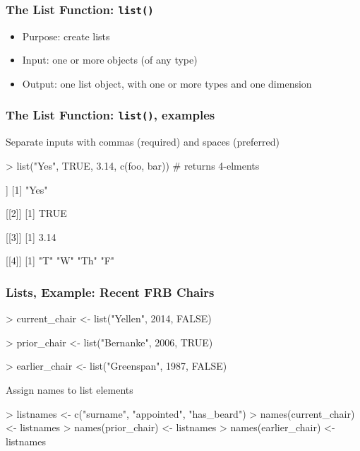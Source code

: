 \documentclass{beamer}
\newcommand{\R}[1]{\texttt{#1}}
\begin{document}
\begin{frame}[fragile]
\frametitle{The List Function: \R{list()}}
\begin{itemize}
\item Purpose: create lists
\item Input: one or more objects (of any type)
\item Output:  one list object, with one or more types and one dimension
\end{itemize}

\end{frame}



\begin{frame}[fragile]
\frametitle{The List Function: \R{list()}, examples}

Separate inputs with commas (required) and spaces (preferred)
\begin{Schunk}
\begin{Sinput}
> list("Yes", TRUE, 3.14, c(foo, bar)) # returns 4-elments
\end{Sinput}
\end{Schunk}
\pause
\begin{Schunk}
\begin{Soutput}
[[1]]
[1] "Yes"

[[2]]
[1] TRUE

[[3]]
[1] 3.14

[[4]]
[1] "T"  "W"  "Th" "F" 
\end{Soutput}
\end{Schunk}
\end{frame}


\begin{frame}[fragile]
\frametitle{Lists, Example: Recent FRB Chairs}

\begin{Schunk}
\begin{Sinput}
> current_chair <- list("Yellen", 2014, FALSE)
\end{Sinput}
\end{Schunk}
\pause
\begin{Schunk}
\begin{Sinput}
> prior_chair   <- list("Bernanke", 2006, TRUE)
\end{Sinput}
\end{Schunk}
\pause
\begin{Schunk}
\begin{Sinput}
> earlier_chair <- list("Greenspan", 1987, FALSE)
\end{Sinput}
\end{Schunk}
\pause
Assign names to list elements
\begin{Schunk}
\begin{Sinput}
> listnames <- c("surname", "appointed", "has_beard")
> names(current_chair) <- listnames
> names(prior_chair)   <- listnames
> names(earlier_chair) <- listnames
\end{Sinput}
\end{Schunk}
\end{frame}
\end{document}
